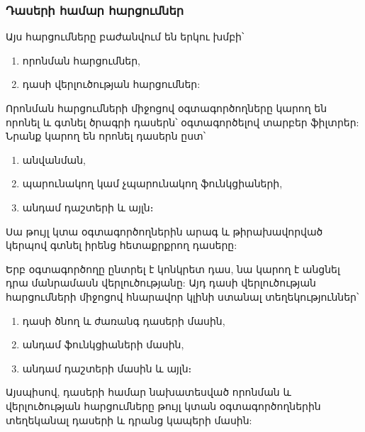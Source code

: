 \subsubsection*{Դասերի համար հարցումներ}\label{subsubsec:classes}

Այս հարցումները բաժանվում են երկու խմբի՝
\begin{enumerate}
    \item որոնման հարցումներ,
    \item դասի վերլուծության հարցումներ:
\end{enumerate}

Որոնման հարցումների միջոցով օգտագործողները կարող են որոնել և գտնել ծրագրի դասերն՝ օգտագործելով տարբեր ֆիլտրեր:
Նրանք կարող են որոնել դասերն ըստ՝
\begin{enumerate}
    \item անվանման,
    \item պարունակող կամ չպարունակող ֆունկցիաների,
    \item անդամ դաշտերի և այլն։
\end{enumerate}

Սա թույլ կտա օգտագործողներին արագ և թիրախավորված կերպով գտնել իրենց հետաքրքրող դասերը:

Երբ օգտագործողը ընտրել է կոնկրետ դաս, նա կարող է անցնել դրա մանրամասն վերլուծությանը: Այդ դասի վերլուծության
հարցումների միջոցով հնարավոր կլինի ստանալ տեղեկություններ՝
\begin{enumerate}
    \item դասի ծնող և ժառանգ դասերի մասին,
    \item անդամ ֆունկցիաների մասին,
    \item անդամ դաշտերի մասին և այլն։
\end{enumerate}

Այսպիսով, դասերի համար նախատեսված որոնման և վերլուծության հարցումները թույլ կտան օգտագործողներին տեղեկանալ դասերի
և դրանց կապերի մասին:
